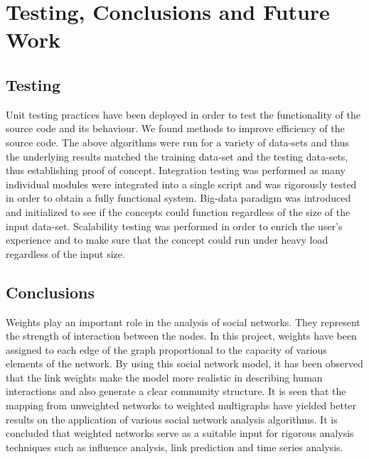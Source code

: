 \def\baselinestretch{1}
\chapter{Testing, Conclusions and Future Work}
\ifpdf
    \graphicspath{{Conclusions/ConclusionsFigs/PNG/}{Conclusions/ConclusionsFigs/PDF/}{Conclusions/ConclusionsFigs/}}
\else
    \graphicspath{{Conclusions/ConclusionsFigs/EPS/}{Conclusions/ConclusionsFigs/}}
\fi

\def\baselinestretch{1.66}

\section{Testing}
Unit testing practices have been deployed in order to test the functionality of the source code and its behaviour. We found methods to improve efficiency of the source code. The above algorithms were run for a variety of data-sets and thus the underlying results matched the training data-set and the testing data-sets, thus establishing proof of concept. Integration testing was performed as many individual modules were integrated into a single script and was rigorously tested in order to obtain a fully functional system. Big-data paradigm was introduced and initialized to see if the concepts could function regardless of the size of the input data-set. Scalability testing was performed in order to enrich the user’s experience and to make sure that the concept could run under heavy load regardless of the input size.

\section{Conclusions}

Weights play an important role in the analysis of social networks. They represent the strength of interaction between the nodes. In this project, weights have been assigned to each edge of the graph proportional to the capacity of various elements of the network. By using this social network model, it has been observed that the link weights make the model more realistic in describing human interactions and also generate a clear community structure. It is seen that the mapping from unweighted networks to weighted multigraphs have yielded better results on the application of various social network analysis algorithms. It is concluded that weighted networks serve as a suitable input for rigorous analysis techniques such as influence analysis, link prediction and time series analysis.

